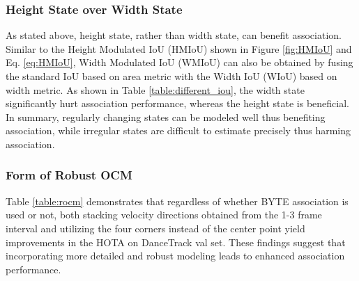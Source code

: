 \documentclass[letterpaper]{article} \usepackage{aaai23}  \usepackage{times}  \usepackage{helvet}  \usepackage{courier}  \usepackage[hyphens]{url}  \usepackage{graphicx} \urlstyle{rm} \def\UrlFont{\rm}  \usepackage{natbib}  \usepackage{caption} \frenchspacing  \setlength{\pdfpagewidth}{8.5in}  \setlength{\pdfpageheight}{11in}  \usepackage{algorithm}
\begin{document}
\subsubsection{Height State over Width State}
As stated above, height state, rather than width state, can benefit association. Similar to the Height Modulated IoU (HMIoU) shown in Figure \ref{fig:HMIoU} and Eq. \ref{eq:HMIoU}, Width Modulated IoU (WMIoU) can also be obtained by fusing the standard IoU based on area metric with the Width IoU (WIoU) based on width metric. As shown in Table \ref{table:different_iou}, the width state significantly hurt association performance, whereas the height state is beneficial. In summary, regularly changing states can be modeled well thus benefiting association, while irregular states are difficult to estimate precisely thus harming association.



\begin{table}
\begin{center}
\caption{Results of different IoU in DanceTrack-val.}
\label{table:different_iou}
\end{center}
\end{table}



\subsubsection{Form of Robust OCM}
Table \ref{table:rocm} demonstrates that regardless of whether BYTE association is used or not, both stacking velocity directions obtained from the 1-3 frame interval and utilizing the four corners instead of the center point yield improvements in the HOTA on DanceTrack val set. These findings suggest that incorporating more detailed and robust modeling leads to enhanced association performance.
\end{document}

